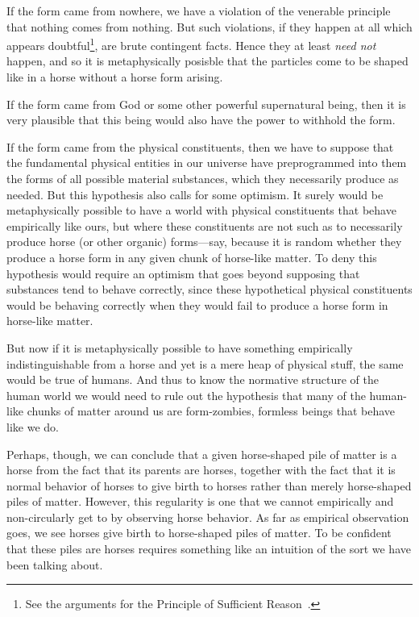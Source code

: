 If the form came from nowhere, we have a violation of the venerable principle that nothing comes from nothing.
But such violations, if they happen at all which appears doubtful\footnote{See the arguments for the Principle
of Sufficient Reason~\parencite{PrussPSR,PrussPSRProbability,DellaRocca2010}.}, are brute contingent facts. Hence they at least
\textit{need
not} happen, and so it is metaphysically posisble that the particles come to be shaped like in a horse without a horse
form arising.

If the form came from God or some other powerful supernatural being, then it is very plausible that this being would also 
have the power to withhold the form.

If the form came from the physical constituents, then we have to suppose that the 
fundamental physical entities in our universe have preprogrammed into them the forms of all possible material substances,
which they necessarily produce as needed. But this hypothesis also calls for some optimism. It surely would be metaphysically
possible to have a world with physical constituents that behave empirically like ours, but where these constituents are not 
such as to necessarily produce horse (or other organic) forms---say, because it is random whether they produce a horse form 
in any given chunk of horse-like matter. To deny this hypothesis would require an optimism that goes beyond supposing that 
substances tend to behave correctly, since these hypothetical physical constituents would be behaving correctly when they 
would fail to produce a horse form in horse-like matter.

But now if it is metaphysically possible to have something empirically indistinguishable from a horse and yet is a mere
heap of physical stuff, the same would be true of humans. And thus to know the normative structure of the human world 
we would need to rule out the hypothesis that many of the human-like chunks of matter around us are form-zombies, formless
beings that behave like we do. 

Perhaps, though, we can conclude that a given horse-shaped pile of matter is a horse from the fact that its 
parents are horses, together with the fact that it is normal behavior of horses to give birth to horses rather
than merely horse-shaped piles of matter. However, this regularity is one that we cannot empirically and non-circularly get to by observing horse behavior. As far as empirical observation goes, we see horses give birth to horse-shaped 
piles of matter. To be confident that these piles are horses requires something like an intuition of the sort we have
been talking about.


